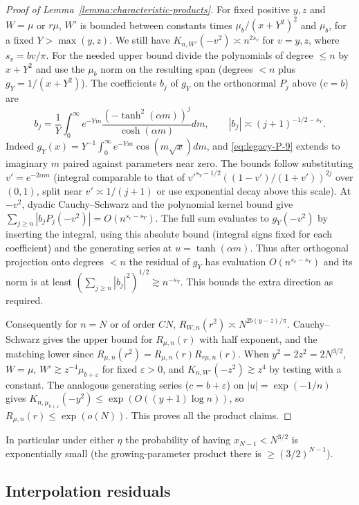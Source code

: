 \begin{proof}[Proof of Lemma~\ref{lemma:characteristic-products}]
For fixed positive $y,z$ and $W=\mu$ or $r\mu$, $W'$ is bounded between constants times $\mu_b/(x+Y^2)^2$ and $\mu_b$, for a fixed $Y>\max(y,z)$. We still have $K_{n,W'}(-v^2)\asymp n^{2s_v}$ for $v=y,z$, where $s_v=bv/\pi$. For the needed upper bound divide the polynomials of degree $\le n$ by $x+Y^2$ and use the $\mu_b$ norm on the resulting span (degrees $<n$ plus $g_Y=1/(x+Y^2)$). The coefficients $b_j$ of $g_Y$ on the orthonormal $P_j$ above ($c=b$) are
\[
 b_j=\frac1Y\int_0^\infty e^{-Ym}\frac{(-\tanh^2(\alpha m))^j}{\cosh(\alpha m)}dm,\qquad
 |b_j|\asymp (j+1)^{-1/2-s_Y}.
\]
Indeed $g_Y(x)=Y^{-1}\int_0^\infty e^{-Ym}\cos(m\sqrt x)dm$, and \eqref{eq:legacy-P-9} extends to imaginary $m$ paired against parameters near zero. The bounds follow substituting $v'=e^{-2\alpha m}$ (integral comparable to that of $v'^{s_Y-1/2}((1-v')/(1+v'))^{2j}$ over $(0,1)$, split near $v'\asymp1/(j+1)$ or use exponential decay above this scale). At $-v^2$, dyadic Cauchy--Schwarz and the polynomial kernel bound give $\sum_{j\ge n}|b_j P_j(-v^2)|=O(n^{s_v-s_Y})$. The full sum evaluates to $g_Y(-v^2)$ by inserting the integral, using this absolute bound (integral signs fixed for each coefficient) and the generating series at $u=\tanh(\alpha m)$. Thus after orthogonal projection onto degrees $<n$ the residual of $g_Y$ has evaluation $O(n^{s_v-s_Y})$ and its norm is at least $(\sum_{j\ge n}|b_j|^2)^{1/2}\gtrsim n^{-s_Y}$. This bounds the extra direction as required.

Consequently for $n=N$ or of order $CN$, $R_{W,n}(r^2)\asymp N^{2b(y-z)/\pi}$. Cauchy--Schwarz gives the upper bound for $R_{\mu,n}(r)$ with half exponent, and the matching lower since $R_{\mu,n}(r^2)=R_{\mu,n}(r)R_{r\mu,n}(r)$. When $y^2=2z^2=2N^{3/2}$, $W=\mu$, $W'\gtrsim z^{-4}\mu_{b+\varepsilon}$ for fixed $\varepsilon>0$, and $K_{n,W'}(-z^2)\gtrsim z^4$ by testing with a constant. The analogous generating series ($c=b+\varepsilon$) on $|u|=\exp(-1/n)$ gives $K_{n,\mu_{b+\varepsilon}}(-y^2)\le\exp(O((y+1)\log n))$, so $R_{\mu,n}(r)\le\exp(o(N))$. This proves all the product claims.
\end{proof}

In particular under either $\eta$ the probability of having $x_{N-1}<N^{3/2}$ is exponentially small (the growing-parameter product there is $\ge (3/2)^{N-1}$).

\subsection{Interpolation residuals}

